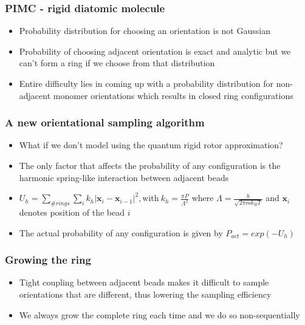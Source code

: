 \documentclass[xcolor=svgnames]{beamer}
\begin{document}
	\begin{frame}
	\frametitle{PIMC - rigid diatomic molecule}
	\begin{itemize}
	\item Probability distribution for choosing an orientation is not Gaussian
	\item Probability of choosing adjacent orientation is exact and analytic but we can't form a ring if we choose from that distribution
	\begin{figure}
	\centering
	\def\svgscale{0.2}
	
	\end{figure}
	\item Entire difficulty lies in coming up with a probability distribution for non-adjacent monomer orientations which results in closed ring configurations
	\begin{figure}
	\centering
	\def\svgscale{0.3}
	
	\end{figure}
	\end{itemize}
	\end{frame}
	
	\begin{frame}
	\frametitle{A new orientational sampling algorithm}
	\begin{itemize}%
	\item What if we don't model using the quantum rigid rotor approximation?
	\item The only factor that affects the probability of any configuration is the \alert{harmonic spring-like interaction} between adjacent beads
	\item $U_h = \displaystyle\sum\limits_{\# rings} \displaystyle\sum\limits_i k_h |\textbf{x}_i - \textbf{x}_{i-1}|^2 ,\text{with} \: k_h = \frac{\pi P}{\Lambda^2}$ where $\Lambda = \frac{h}{\sqrt{2 \pi m k_B T}}$ \: and $\textbf{x}_i$ denotes position of the bead $i$
	\item The actual probability of any configuration is given by $P_{act} = exp(-U_h) $
	\end{itemize}
	\end{frame}

	\begin{frame}
	\frametitle{Growing the ring}
	\begin{itemize}%
	\item Tight coupling between adjacent beads makes it difficult to sample orientations that are different, thus lowering the sampling efficiency
	\item We always \alert{grow the complete ring each time} and  we do so \alert{non-sequentially}
	\end{itemize}
	\end{frame}
\end{document}
